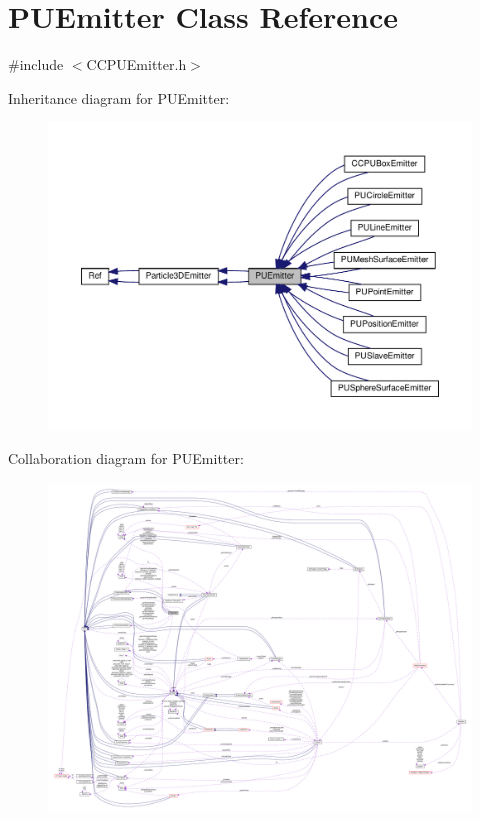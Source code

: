 \hypertarget{classPUEmitter}{}\section{P\+U\+Emitter Class Reference}
\label{classPUEmitter}


{\ttfamily \#include $<$C\+C\+P\+U\+Emitter.\+h$>$}



Inheritance diagram for P\+U\+Emitter\+:
\nopagebreak
\begin{figure}[H]
\begin{center}
\leavevmode
\includegraphics[width=350pt]{classPUEmitter__inherit__graph}
\end{center}
\end{figure}


Collaboration diagram for P\+U\+Emitter\+:
\nopagebreak
\begin{figure}[H]
\begin{center}
\leavevmode
\includegraphics[width=350pt]{classPUEmitter__coll__graph}
\end{center}
\end{figure}
